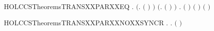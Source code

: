 \begin{SaveVerbatim}{HOLCCSTheoremsTRANSXXPARXXEQ}
\HOLTokenTurnstile{} \HOLSymConst{\HOLTokenForall{}}   .
        \HOLSymConst{\ensuremath{\mid}}  \HOLTokenTransBegin{}\HOLTokenTransEnd {} \HOLSymConst{\HOLTokenEquiv{}}
       \ensuremath{(}\HOLSymConst{\HOLTokenExists{}}. \ensuremath{(} \HOLSymConst{\ensuremath{=}}  \HOLSymConst{\ensuremath{\mid}} \ensuremath{)} \HOLSymConst{\HOLTokenConj{}}  \HOLTokenTransBegin{}\HOLTokenTransEnd {}\ensuremath{)} \HOLSymConst{\HOLTokenDisj{}}
       \ensuremath{(}\HOLSymConst{\HOLTokenExists{}}. \ensuremath{(} \HOLSymConst{\ensuremath{=}}  \HOLSymConst{\ensuremath{\mid}} \ensuremath{)} \HOLSymConst{\HOLTokenConj{}}  \HOLTokenTransBegin{}\HOLTokenTransEnd {}\ensuremath{)} \HOLSymConst{\HOLTokenDisj{}}
       \HOLSymConst{\HOLTokenExists{}}  .
           \ensuremath{(} \HOLSymConst{\ensuremath{=}} \HOLConst{\ensuremath{\tau}}\ensuremath{)} \HOLSymConst{\HOLTokenConj{}} \ensuremath{(} \HOLSymConst{\ensuremath{=}}  \HOLSymConst{\ensuremath{\mid}} \ensuremath{)} \HOLSymConst{\HOLTokenConj{}}  \HOLTokenTransBegin{} \HOLTokenTransEnd {} \HOLSymConst{\HOLTokenConj{}}
            \HOLTokenTransBegin{} \ensuremath{(} \ensuremath{)}\HOLTokenTransEnd {}
\end{SaveVerbatim}
\newcommand{\HOLCCSTheoremsTRANSXXPARXXEQ}{\UseVerbatim{HOLCCSTheoremsTRANSXXPARXXEQ}}
\begin{SaveVerbatim}{HOLCCSTheoremsTRANSXXPARXXNOXXSYNCR}
\HOLTokenTurnstile{} \HOLSymConst{\HOLTokenForall{}} .
        \HOLSymConst{\HOLTokenNotEqual{}}   \HOLSymConst{\HOLTokenImp{}}
       \HOLSymConst{\HOLTokenForall{}}  . \HOLSymConst{\HOLTokenNeg{}}\ensuremath{(} \HOLSymConst{\ensuremath{\ldotp}} \HOLSymConst{\ensuremath{\mid}}  \HOLSymConst{\ensuremath{\ldotp}} \HOLTokenTransBegin\HOLConst{\ensuremath{\tau}}\HOLTokenTransEnd {}\ensuremath{)}
\end{SaveVerbatim}
